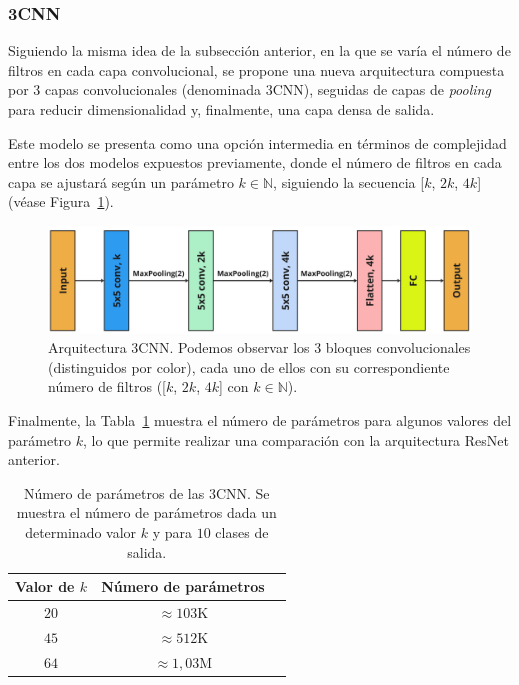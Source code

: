 \subsubsection{3CNN}\label{subsubsec:3CNN}

Siguiendo la misma idea de la subsección anterior, en la que se varía el número de filtros en cada capa convolucional, se propone una nueva arquitectura compuesta por $3$ capas convolucionales (denominada $3$CNN), seguidas de capas de \textit{pooling} para reducir dimensionalidad y, finalmente, una capa densa de salida.\newline

Este modelo se presenta como una opción intermedia en términos de complejidad entre los dos modelos expuestos previamente, donde el número de filtros en cada capa se ajustará según un parámetro $k \in \mathbb{N}$, siguiendo la secuencia [$k$, $2k$, $4k$] (véase Figura~\ref{fig:3CNN}).\newline

\begin{figure}[h]
    \centering
    \includegraphics[width=0.8\linewidth]{img/experiments/3CNN.png}
    \caption[Arquitectura $3$CNN.]{Arquitectura $3$CNN. Podemos observar los 3 bloques convolucionales (distinguidos por color), cada uno de ellos con su correspondiente número de filtros ([$k$, $2k$, $4k$] con $k \in \mathbb{N}$).}\label{fig:3CNN}
\end{figure}

Finalmente, la Tabla~\ref{tab:numero-parametros3cnn} muestra el número de parámetros para algunos valores del parámetro $k$, lo que permite realizar una comparación con la arquitectura ResNet anterior.

\begin{table}[ht]
    \centering
    \begin{tabular}{|c|c|c|}
    \hline
    \textbf{Valor de $k$}           & \textbf{Número de parámetros}                     
    \\ \hline
    $20$                  & $\approx 103$\space K                                            \\ \hline
    $45$                  & $\approx 512$\space K                                             \\ \hline
    $64$                  & $\approx 1,03$\space M                                             \\ \hline
    \end{tabular}
    \caption[Número de parámetros de las arquitecturas $3$CNN.]{Número de parámetros de las $3$CNN. Se muestra el número de parámetros dada un determinado valor $k$ y para $10$ clases de salida.}\label{tab:numero-parametros3cnn}
\end{table}

